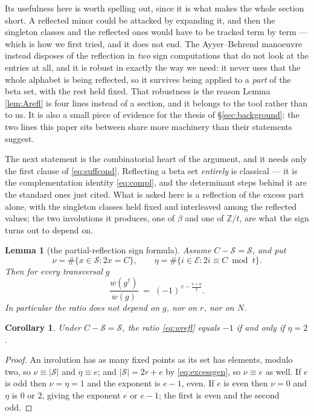\documentclass[11pt,reqno]{amsart}
\theoremstyle{plain}
\newtheorem{lemma}[theorem]{Lemma}
\newtheorem{corollary}[theorem]{Corollary}
\theoremstyle{definition}
\newcommand{\ZZ}{\mathbb{Z}}
\begin{document}
Its usefulness here is worth spelling out, since it is what makes the whole section short. A
reflected minor could be attacked by expanding it, and then the singleton classes and the reflected
ones would have to be tracked term by term --- which is how we first tried, and it does not end.
The Ayyer--Behrend manoeuvre instead disposes of the reflection in \emph{two} sign computations that
do not look at the entries at all, and it is robust in exactly the way we need: it never uses that
the whole alphabet is being reflected, so it survives being applied to a \emph{part} of the beta
set, with the rest held fixed. That robustness is the reason Lemma \ref{lem:Arefl} is four lines
instead of a section, and it belongs to the tool rather than to us. It is also a small piece of
evidence for the thesis of \S\ref{sec:background}: the two lines this paper sits between share more
machinery than their statements suggest.

The next statement is the combinatorial heart of the argument, and it needs only the first clause of
\eqref{eq:suffcond}. Reflecting a beta set \emph{entirely} is classical --- it is the
complementation identity \eqref{eq:compl}, and the determinant steps behind it are the standard ones
just cited. What is asked here is a reflection of the excess part alone, with the singleton classes
held fixed and interleaved among the reflected values; the two involutions it produces, one of
$\beta$ and one of $\ZZ/t$, are what the sign turns out to depend on.

\begin{lemma}[the partial-reflection sign formula]\label{lem:signformula}
Assume $C-\mathcal{S}=\mathcal{S}$, and put
\[
\nu=\#\{x\in\mathcal{S}:2x=C\},\qquad \eta=\#\{i\in\mathcal{E}:2i\equiv C \bmod t\}.
\]
Then for every transversal $g$
\begin{equation}\label{eq:wrefl}
\frac{w(g^{\dagger})}{w(g)}\;=\;(-1)^{\,e-\frac{\nu+\eta}{2}} .
\end{equation}
In particular the ratio does not depend on $g$, nor on $r$, nor on $N$.
\end{lemma}

\begin{corollary}\label{cor:whenminus}
Under $C-\mathcal{S}=\mathcal{S}$, the ratio \eqref{eq:wrefl} equals $-1$ if and only if $\eta=2$.
\end{corollary}

\begin{proof}
An involution has as many fixed points as its set has elements, modulo two, so $\nu\equiv|\mathcal{S}|$
and $\eta\equiv e$; and $|\mathcal{S}|=2r+e$ by \eqref{eq:excessgen}, so $\nu\equiv e$ as well. If $e$
is odd then $\nu=\eta=1$ and the exponent is $e-1$, even. If $e$ is even then $\nu=0$ and $\eta$ is
$0$ or $2$, giving the exponent $e$ or $e-1$; the first is even and the second odd.
\end{proof}
\end{document}
